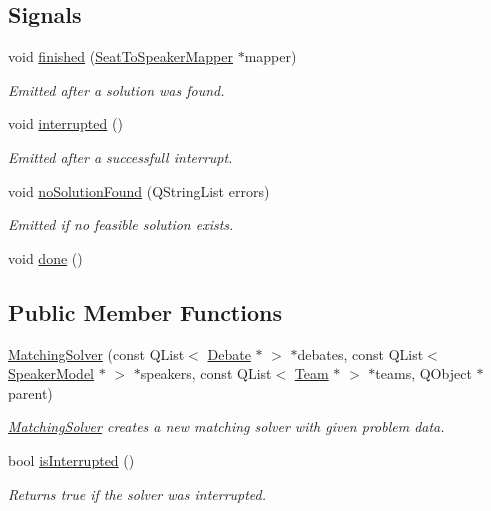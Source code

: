 \subsection*{Signals}
\begin{DoxyCompactItemize}
\item 
void \hyperlink{classMatchingSolver_a4636879fe14fc8d2b5e41dd6be4a9eed}{finished} (\hyperlink{classSeatToSpeakerMapper}{Seat\-To\-Speaker\-Mapper} $\ast$mapper)
\begin{DoxyCompactList}\small\item\em Emitted after a solution was found. \end{DoxyCompactList}\item 
\hypertarget{classMatchingSolver_a8d685c64a6f848b0a3d8f42f5fe9a216}{void \hyperlink{classMatchingSolver_a8d685c64a6f848b0a3d8f42f5fe9a216}{interrupted} ()}\label{classMatchingSolver_a8d685c64a6f848b0a3d8f42f5fe9a216}

\begin{DoxyCompactList}\small\item\em Emitted after a successfull interrupt. \end{DoxyCompactList}\item 
void \hyperlink{classMatchingSolver_aaf7b8cbfb8ee9a55ef5a10bc20ef5e7a}{no\-Solution\-Found} (Q\-String\-List errors)
\begin{DoxyCompactList}\small\item\em Emitted if no feasible solution exists. \end{DoxyCompactList}\item 
void \hyperlink{classMatchingSolver_af02dc51033a7a381855a1bd6fd77a39c}{done} ()
\end{DoxyCompactItemize}
\subsection*{Public Member Functions}
\begin{DoxyCompactItemize}
\item 
\hyperlink{classMatchingSolver_a0b9694c01fe96c7586f218dd11f7e9bc}{Matching\-Solver} (const Q\-List$<$ \hyperlink{classDebate}{Debate} $\ast$ $>$ $\ast$debates, const Q\-List$<$ \hyperlink{classSpeakerModel}{Speaker\-Model} $\ast$ $>$ $\ast$speakers, const Q\-List$<$ \hyperlink{classTeam}{Team} $\ast$ $>$ $\ast$teams, Q\-Object $\ast$parent)
\begin{DoxyCompactList}\small\item\em \hyperlink{classMatchingSolver}{Matching\-Solver} creates a new matching solver with given problem data. \end{DoxyCompactList}\item 
\hypertarget{classMatchingSolver_ad58841ead4b492150652e807e7ac4181}{bool \hyperlink{classMatchingSolver_ad58841ead4b492150652e807e7ac4181}{is\-Interrupted} ()}\label{classMatchingSolver_ad58841ead4b492150652e807e7ac4181}

\begin{DoxyCompactList}\small\item\em Returns {\ttfamily true} if the solver was interrupted. \end{DoxyCompactList}\end{DoxyCompactItemize}


